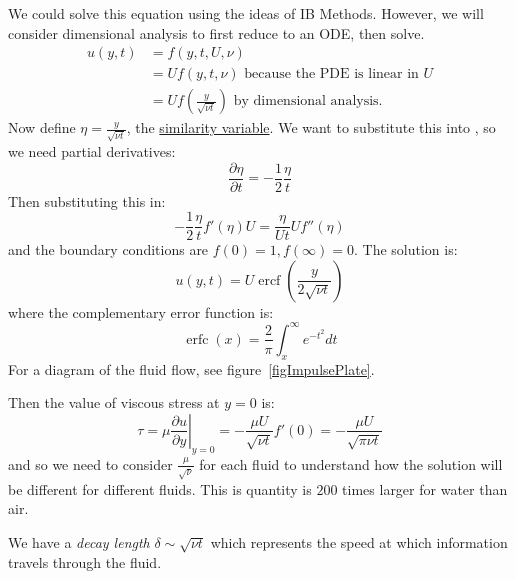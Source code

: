 \documentclass[../Main.tex]{subfiles}
\begin{document}
\begin{example}
    We could solve this equation using the ideas of IB Methods. However, we will consider dimensional analysis to first reduce to an ODE, then solve.
    \begin{align*}
        u(y, t) &= f(y, t, U, \nu) \\
        &= Uf(y, t, \nu) \text{ because the PDE is linear in $U$} \\
        &= U f\left(\frac{y}{\sqrt{\nu t}}\right) \text{ by dimensional analysis}.
    \end{align*}
    Now define $\eta = \frac{y}{\sqrt{\nu t}}$, the \underline{similarity variable}. We want to substitute this into , so we need partial derivatives:
    \begin{equation*}
        \frac{\partial \eta}{\partial t} = -\frac12 \frac{\eta}{t}
    \end{equation*}
    Then substituting this in:
    \begin{equation*}
        -\frac12 \frac{\eta}{t} f'(\eta) U = \frac{\eta}{Ut} U f''(\eta) %
    \end{equation*}
    and the boundary conditions are $f(0) = 1, f(\infty) = 0$. The solution is:
    \begin{equation}
        u(y, t) = U \operatorname{ercf}\left(\frac{y}{2\sqrt{\nu t}}\right)
        \label{eqnFluidDiffusionSoln}
    \end{equation}
    where the complementary error function is:
    \begin{equation*}
        \operatorname{erfc}(x) = \frac{2}{\pi} \int_x^\infty e^{-t^2} dt
    \end{equation*}
    For a diagram of the fluid flow, see figure~\ref{figImpulsePlate}.

    Then the value of viscous stress at $y = 0$ is:
    \begin{equation*}
        \tau = \mu \left.\frac{\partial u}{\partial y}\right|_{y = 0} = -\frac{\mu U}{\sqrt{\nu t}} f'(0) = -\frac{\mu U}{\sqrt{\pi \nu t}}
    \end{equation*}
    and so we need to consider $\frac{\mu}{\sqrt{\nu}}$ for each fluid to understand how the solution will be different for different fluids. This is quantity is $200$ times larger for water than air.

    We have a \textit{decay length} $\delta \sim \sqrt{\nu t}$ which represents the speed at which information travels through the fluid.
    \label{expImpulsePlate}
\end{example}
\end{document}
